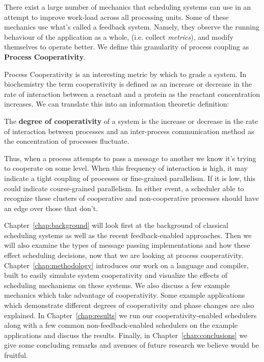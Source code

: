 There exist a large number of mechanics that scheduling systems can use in an 
attempt to improve work-load across all processing units. Some of these 
mechanics use what's called a feedback system. Namely, they observe the 
running behaviour of the application as a whole, (i.e. collect {\em metrics}),
and modify themselves to operate better. We define this granularity of process
coupling as \textbf{Process Cooperativity}.

Process Cooperativity is an interesting metric by which to grade a system. In
biochemistry the term cooperativity is defined as an increase or decrease
in the rate of interaction between a reactant and a protein as the reactant
concentration increases. We can translate this into an information theoretic 
definition: 
\begin{newdef}\label{def:degree of cooperativity}
    The {\bf degree of cooperativity} of a system is the increase or decrease 
    in the rate of interaction between processes and an inter-process 
    communication method as the concentration of processes fluctuate.
\end{newdef}

Thus, when a process attempts to pass a message to another we know it's trying 
to cooperate on some level. When this frequency of interaction is high, it may
indicate a tight coupling of processes or fine-grained parallelism. If it is 
low, this could indicate course-grained parallelism. In either event, a 
scheduler able to recognize these clusters of cooperative and non-cooperative 
processes should have an edge over those that don't.

Chapter~\ref{chap:background} will look first at the background of classical 
scheduling systems as well as the recent feedback-enabled approaches. Then we 
will also examine the types of message passing implementations and how these
effect scheduling decisions, now that we are looking at process cooperativity.
Chapter~\ref{chap:methodology} introduces our work on a language and compiler,
built to easily simulate system cooperativity and visualize the effects of 
scheduling mechanisms on these systems. We also discuss a few example mechanics
which take advantage of cooperativity. Some example applications which 
demonstrate different degrees of cooperativity and phase changes are also 
explained.
In Chapter~\ref{chap:results} we run our cooperativity-enabled schedulers along
with a few common non-feedback-enabled schedulers on the example applications
and discuss the results. 
Finally, in Chapter~\ref{chap:conclusions} we give some concluding remarks and
avenues of future research we believe would be fruitful.

